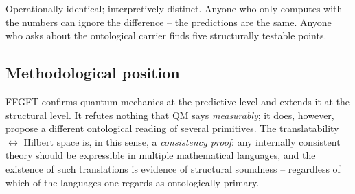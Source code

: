 Operationally identical; interpretively distinct. Anyone who only
computes with the numbers can ignore the difference -- the
predictions are the same. Anyone who asks about the ontological
carrier finds five structurally testable points.

\subsection*{Methodological position}

FFGFT confirms quantum mechanics at the predictive level and extends
it at the structural level. It refutes nothing that QM says
\emph{measurably}; it does, however, propose a different ontological
reading of several primitives. The translatability $\leftrightarrow$
Hilbert space is, in this sense, a \emph{consistency proof}: any
internally consistent theory should be expressible in multiple
mathematical languages, and the existence of such translations is
evidence of structural soundness -- regardless of which of the
languages one regards as ontologically primary.
